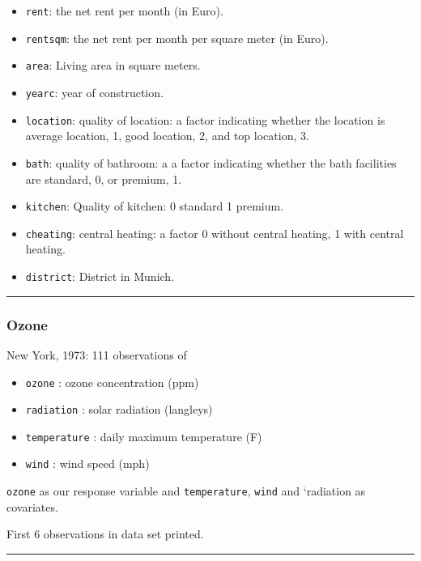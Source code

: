 \documentclass[]{article}
\providecommand{\tightlist}{%
  \setlength{\itemsep}{0pt}\setlength{\parskip}{0pt}}
\begin{document}
\begin{itemize}
\tightlist
\item
  \texttt{rent}: the net rent per month (in Euro).
\item
  \texttt{rentsqm}: the net rent per month per square meter (in Euro).
\item
  \texttt{area}: Living area in square meters.
\item
  \texttt{yearc}: year of construction.
\item
  \texttt{location}: quality of location: a factor indicating whether
  the location is average location, 1, good location, 2, and top
  location, 3.
\item
  \texttt{bath}: quality of bathroom: a a factor indicating whether the
  bath facilities are standard, 0, or premium, 1.
\item
  \texttt{kitchen}: Quality of kitchen: 0 standard 1 premium.
\item
  \texttt{cheating}: central heating: a factor 0 without central
  heating, 1 with central heating.
\item
  \texttt{district}: District in Munich.
\end{itemize}

\begin{center}\rule{0.5\linewidth}{\linethickness}\end{center}

\hypertarget{ozone}{%
\subsubsection{Ozone}\label{ozone}}

New York, 1973: 111 observations of

\begin{itemize}
\tightlist
\item
  \texttt{ozone} : ozone concentration (ppm)
\item
  \texttt{radiation} : solar radiation (langleys)
\item
  \texttt{temperature} : daily maximum temperature (F)
\item
  \texttt{wind} : wind speed (mph)
\end{itemize}

\texttt{ozone} as our response variable and \texttt{temperature},
\texttt{wind} and `radiation as covariates.

First 6 observations in data set printed.

\begin{center}\rule{0.5\linewidth}{\linethickness}\end{center}
\end{document}
